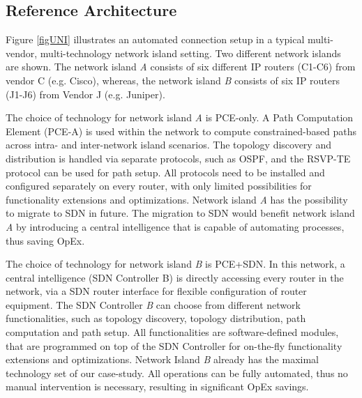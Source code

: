\documentclass[smallextended]{svjour3}
\begin{document}
\par \subsection{Reference Architecture}

\par Figure \ref{figUNI} illustrates an automated connection setup in a typical
multi-vendor, multi-technology network island setting. Two different network
islands are shown. The network island \emph{A} consists of six different IP
routers (C1-C6) from vendor C (e.g. Cisco), whereas, the network island \emph{B} consists
of six IP routers (J1-J6) from Vendor J (e.g. Juniper).

\par The choice of technology for network island \emph{A} is PCE-only. A Path
Computation Element (PCE-A) is used within the network to compute constrained-based
paths across intra- and inter-network island scenarios. The topology discovery
and distribution is handled via separate protocols, such as OSPF, and the
RSVP-TE protocol can be used for path setup. All protocols need to be installed and
configured separately on every router, with only limited
possibilities for functionality extensions and optimizations. Network island
\emph{A} has the possibility to migrate to SDN in future.
The migration to SDN would benefit network island \emph{A} by introducing a central intelligence that is
capable of automating processes, thus saving OpEx.

\par The choice of technology for network island \emph{B} is PCE+SDN. In this
network, a central intelligence (SDN Controller B) is directly accessing every
router in the network, via a SDN router interface for flexible
configuration of router equipment. The SDN Controller \emph{B} can choose from
different network functionalities, such as topology discovery, topology
distribution, path computation and path setup. All functionalities are
software-defined modules, that are programmed on top of the SDN Controller for
on-the-fly functionality extensions and optimizations. Network Island \emph{B} already
has the maximal technology set of our case-study. All operations can be fully
automated, thus no manual intervention is necessary, resulting in significant
OpEx savings.
\end{document}
